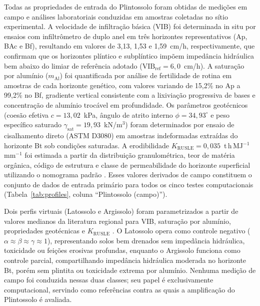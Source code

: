 \documentclass[pdflatex,sn-basic]{sn-jnl}
\begin{document}
Todas as propriedades de entrada do Plintossolo foram obtidas de medições em campo e análises laboratoriais conduzidas em amostras coletadas no sítio experimental. A velocidade de infiltração básica (VIB) foi determinada in situ por ensaios com infiltrômetro de duplo anel em três horizontes representativos (Ap, BAc e Bf), resultando em valores de 3,13, 1,53 e 1,59~cm/h, respectivamente, que confirmam que os horizontes plíntico e subplíntico impõem impedância hidráulica bem abaixo do limiar de referência adotado ($\mathrm{VIB_{ref}} = 6{,}0$~cm/h). A saturação por alumínio ($m_{\mathrm{Al}}$) foi quantificada por análise de fertilidade de rotina em amostras de cada horizonte genético, com valores variando de 15,2\% no Ap a 99,2\% no Bf, gradiente vertical consistente com a lixiviação progressiva de bases e concentração de alumínio trocável em profundidade. Os parâmetros geotécnicos (coesão efetiva $c = 13{,}02$~kPa, ângulo de atrito interno $\phi = 34{,}93^\circ$ e peso específico saturado $\gamma_{\mathrm{sat}} = 19{,}93$~kN/m$^3$) foram determinados por ensaio de cisalhamento direto (ASTM D3080) em amostras indeformadas extraídas do horizonte Bt sob condições saturadas. A erodibilidade $K_{\mathrm{RUSLE}} = 0{,}035$~t\,h\,MJ$^{-1}$\,mm$^{-1}$ foi estimada a partir da distribuição granulométrica, teor de matéria orgânica, código de estrutura e classe de permeabilidade do horizonte superficial utilizando o nomograma padrão \citep{wischmeier_et_al_1971}. Esses valores derivados de campo constituem o conjunto de dados de entrada primário para todos os cinco testes computacionais (Tabela~\ref{tab:profiles}, coluna ``Plintossolo (campo)'').

Dois perfis virtuais (Latossolo e Argissolo) foram parametrizados a partir de valores medianos da literatura regional para VIB, saturação por alumínio, propriedades geotécnicas e $K_{\mathrm{RUSLE}}$ \citep{silva_et_al_2009,bertoni_lombardi_neto_2017}. O Latossolo opera como controle negativo ($\alpha \approx \beta \approx \gamma \approx 1$), representando solos bem drenados sem impedância hidráulica, toxicidade ou feições erosivas profundas, enquanto o Argissolo funciona como controle parcial, compartilhando impedância hidráulica moderada no horizonte Bt, porém sem plintita ou toxicidade extrema por alumínio. Nenhuma medição de campo foi conduzida nessas duas classes; seu papel é exclusivamente computacional, servindo como referências contra as quais a amplificação do Plintossolo é avaliada.
\end{document}
